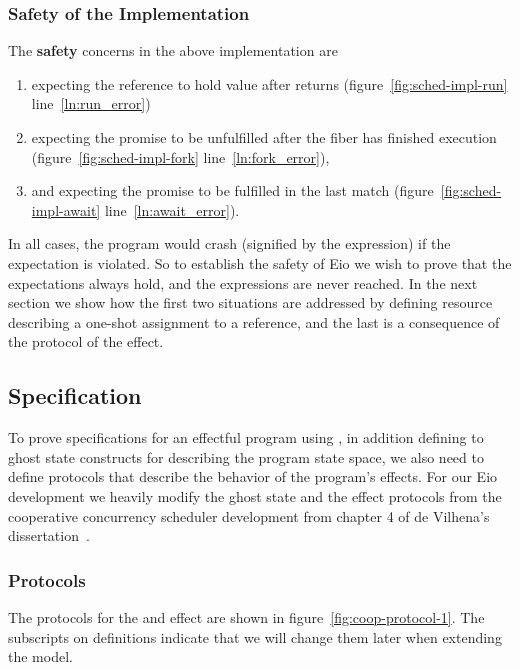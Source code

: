 \subsubsection{Safety of the Implementation}
The \textbf{safety} concerns in the above implementation are
\begin{enumerate}
  \item {} expecting the  reference to hold  value after  returns (figure~\ref{fig:sched-impl-run} line~\ref{ln:run_error})
  \item {} expecting the promise to be unfulfilled after the fiber has finished execution (figure~\ref{fig:sched-impl-fork} line~\ref{ln:fork_error}),
  \item and  expecting the promise to be fulfilled in the last match (figure~\ref{fig:sched-impl-await} line~\ref{ln:await_error}).
\end{enumerate}
In all cases, the program would crash (signified by the  expression) if the expectation is violated.
So to establish the safety of Eio we wish to prove that the expectations always hold, and the  expressions are never reached.
In the next section we show how the first two situations are addressed by defining resource describing a one-shot assignment to a reference, and the last is a consequence of the protocol of the \esuspend{} effect.

\subsection{Specification}
\label{sec:sched-spec}

To prove specifications for an effectful program using \hazel{}, in addition defining to ghost state constructs for describing the program state space, we also need to define protocols that describe the behavior of the program's effects.
For our Eio development we heavily modify the ghost state and the effect protocols from the cooperative concurrency scheduler development from chapter 4 of de Vilhena's dissertation~\cite{de2022proof}.

\subsubsection{Protocols}
\label{sec:sched-spec-protocols}

The protocols for the \efork{} and \esuspend{} effect are shown in figure~\ref{fig:coop-protocol-1}.
The subscripts on definitions indicate that we will change them later when extending the model.


